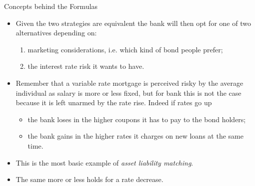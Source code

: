 \documentclass{beamer}
\begin{document}
\begin{frame}{Concepts behind the Formulas}
	\begin{itemize}
		\item<1-> Given the two strategies are equivalent the bank will then opt for one of two alternatives depending on:
		\begin{enumerate}
			\item marketing considerations, i.e. which kind of bond people prefer;
			\item the interest rate risk it wants to have.
		\end{enumerate} 
		\item<2-> Remember that a variable rate mortgage is perceived risky by the average individual as salary is more or less fixed, but for bank this is not the case because it is left unarmed by the rate rise. Indeed if rates go up
		\begin{itemize}
			\item the bank loses in the higher coupons it has to pay to the bond holders;
			\item the bank gains in the higher rates it charges on new loans at the same time.
		\end{itemize}
		\item<3-> This is the most basic example of \emph{asset liability matching}.
		\item<3-> The same more or less holds for a rate decrease.%
	\end{itemize}
\end{frame}
\end{document}
